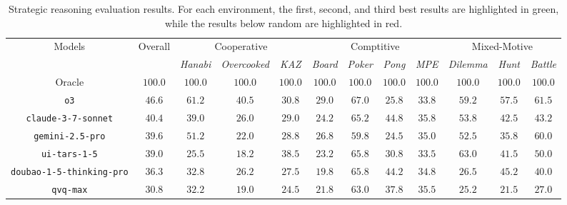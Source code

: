 \begin{table}[t]
\centering
\caption{Strategic reasoning evaluation results. For each environment, the \colorbox{first}{first}, \colorbox{second}{second}, and \colorbox{third}{third} best results are highlighted in green, while the results \colorbox{below}{below random} are highlighted in red.}
\label{tab:reasoning}
\scriptsize
\setlength{\tabcolsep}{6.5pt}
\begin{tabular}{cccccccccccc}
\toprule
\multirow{2}{*}{Models}
& \multirow{2}{*}{Overall} & \multicolumn{3}{c}{Cooperative} & \multicolumn{4}{c}{Comptitive} & \multicolumn{3}{c}{Mixed-Motive} \\
& & \textit{Hanabi} & \textit{Overcooked} & \textit{KAZ} & \textit{Board}
& \textit{Poker}    & \textit{Pong} & \textit{MPE} & \textit{Dilemma} & \textit{Hunt} & \textit{Battle} \\
\midrule
Oracle & $100.0$ & $100.0$ & $100.0$ & $100.0$ & $100.0$ & $100.0$ & $100.0$ & $100.0$ & $100.0$ & $100.0$ & $100.0$ \\
\midrule
\texttt{o3} & $46.6$ & \cellcolor{first} $61.2$ & \cellcolor{first} $40.5$ & $30.8$ & \cellcolor{first} $29.0$ & \cellcolor{first} $67.0$ & \cellcolor{below} $25.8$ & $33.8$ & \cellcolor{second} $59.2$ & \cellcolor{first} $57.5$ & \cellcolor{first} $61.5$ \\
\texttt{claude-3-7-sonnet} & $40.4$ & \cellcolor{third} $39.0$ & $26.0$ & $29.0$ & \cellcolor{third} $24.2$ & $65.2$ & \cellcolor{first} $44.8$ & \cellcolor{first} $35.8$ & \cellcolor{third} $53.8$ & \cellcolor{third} $42.5$ & $43.2$ \\
\texttt{gemini-2.5-pro} & $39.6$ & \cellcolor{second} $51.2$ & $22.0$ & $28.8$ & \cellcolor{second} $26.8$ & $59.8$ & \cellcolor{below} $24.5$ & $35.0$ & $52.5$ & $35.8$ & \cellcolor{second} $60.0$ \\
\texttt{ui-tars-1-5} & $39.0$ & $25.5$ & $18.2$ & \cellcolor{third} $38.5$ & $23.2$ & \cellcolor{second} $65.8$ & \cellcolor{below} $30.8$ & $33.5$ & \cellcolor{first} $63.0$ & $41.5$ & \cellcolor{third} $50.0$ \\
\texttt{doubao-1-5-thinking-pro} & $36.3$ & $32.8$ & $26.2$ & $27.5$ & $19.8$ & \cellcolor{second} $65.8$ & \cellcolor{second} $44.2$ & $34.8$ & $26.5$ & \cellcolor{second} $45.2$ & $40.0$ \\
\texttt{qvq-max} & $30.8$ & $32.2$ & $19.0$ & $24.5$ & $21.8$ & $63.0$ & $37.8$ & \cellcolor{third} $35.5$ & \cellcolor{below} $25.2$ & \cellcolor{below} $21.5$ & $27.0$ \\
\midrule

\end{tabular}
\end{table}
